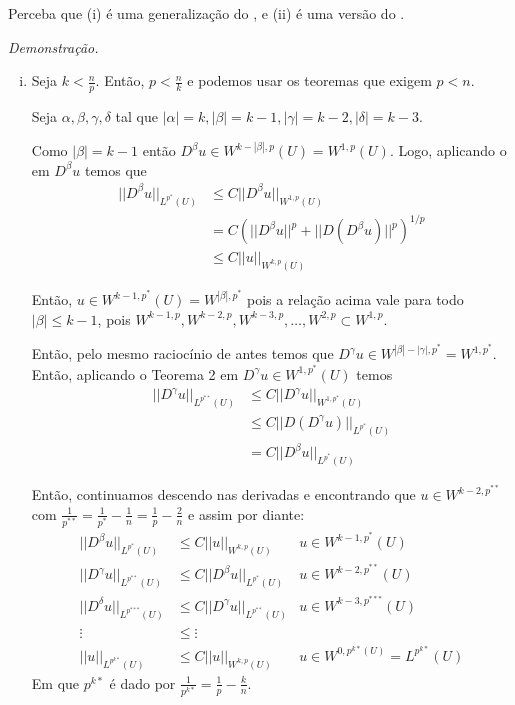 \documentclass[a4paper, 11pt]{book}
\begin{document}
Perceba que (i) é uma generalização do , e (ii) é uma versão do .

\textit{Demonstração.}\begin{enumerate}[(i)]
	\item Seja $k < \frac{n}{p}$. Então, \( p < \frac{n}{k} \) e podemos usar os teoremas que exigem $p<n$.
	
	Seja $\alpha, \beta, \gamma, \delta$ tal que $|\alpha|=k, |\beta|=k-1, |\gamma|=k-2, |\delta|=k-3$.
	
	Como $|\beta|=k-1$ então $D^\beta u \in W^{k - |\beta|,p}(U) = W^{1,p}(U)$. Logo, aplicando o  em $D^\beta u$ temos que  \begin{align*}
		||D^\beta u||_{L^{p^*}(U)} &\leq C || D^\beta u ||_{W^{1,p}(U)} \\ &= C\left( ||D^\beta u||^p + ||D(D^\beta u)||^p \right)^{1/p} \\
		&\leq C ||u||_{W^{k,p}(U)}
	\end{align*}
	
	Então, $u \in W^{k-1,p^*}(U) = W^{|\beta|, p^*}$ pois a relação acima vale para todo $|\beta|\leq k-1$, pois $ W^{k-1,p}, W^{k-2,p}, W^{k-3,p}, \ldots, W^{2,p} \subset W^{1,p} $.
	
	Então, pelo mesmo raciocínio de antes temos que $ D^\gamma u \in W^{|\beta| - |\gamma|,p^*} = W^{1,p^*} $. Então, aplicando o Teorema 2 em $D^\gamma u \in W^{1,p^*}(U)$ temos \begin{align*}
		||D^\gamma u||_{L^{p^{**}}(U)} &\leq C ||D^\gamma u ||_{W^{1,p^*}(U)} \\ &\leq C ||D(D^\gamma u)||_{L^{p^*}(U)}\\ &= C ||D^\beta u||_{L^{p^*}(U)}
	\end{align*}
	
	Então, continuamos descendo nas derivadas e encontrando que $u \in W^{k-2, p^{**}}$ com $\frac{1}{p^{**}} = \frac{1}{p^*} - \frac{1}{n} = \frac{1}{p} - \frac{2}{n}$ e assim por diante: \begin{align*}
		||D^\beta u||_{L^{p^*}(U)} &\leq C ||u||_{W^{k,p}(U)} & u \in W^{k-1,p^*}(U)\\
		||D^\gamma u||_{L^{p^{**}}(U)} &\leq C ||D^\beta u||_{L^{p^*}(U)} & u \in W^{k-2, p^{**}}(U) \\
		||D^\delta u||_{L^{p^{***}}(U)} &\leq C ||D^\gamma u||_{L^{p^{**}}(U)} & u \in W^{k-3, p^{***}}(U) \\
		\vdots &\leq \vdots \\
		||u||_{L^{p^{k*}}(U)} &\leq C ||u||_{W^{k,p}(U)} & u \in W^{0, p^{k*}(U)} = L^{p^{k*}}(U)  
	\end{align*}
	Em que $ p^{k*} $ é dado por $ \frac{1}{p^{k*}} = \frac{1}{p} - \frac{k}{n} $. 
	

\end{enumerate}
\end{document}
